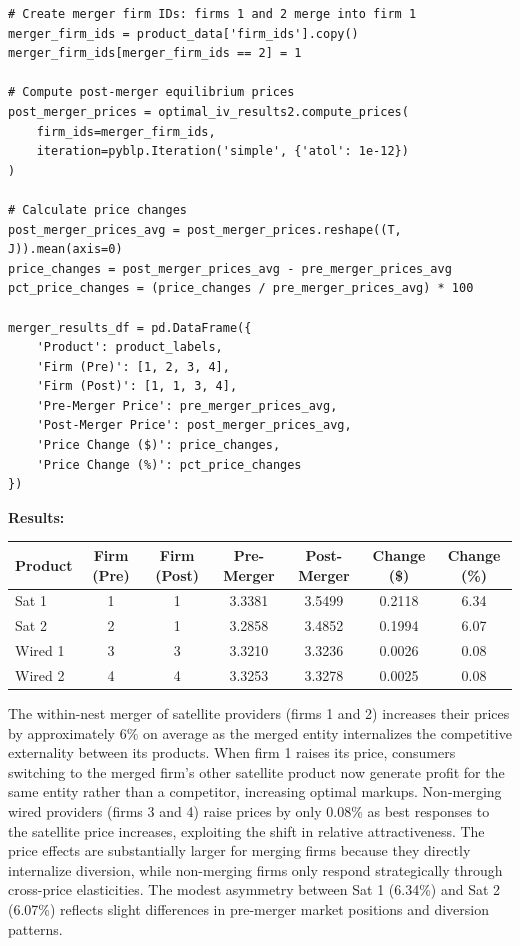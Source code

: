\documentclass[english,11pt]{article}
\begin{document}
\begin{enumerate}
\begin{verbatim}
# Create merger firm IDs: firms 1 and 2 merge into firm 1
merger_firm_ids = product_data['firm_ids'].copy()
merger_firm_ids[merger_firm_ids == 2] = 1

# Compute post-merger equilibrium prices
post_merger_prices = optimal_iv_results2.compute_prices(
    firm_ids=merger_firm_ids,
    iteration=pyblp.Iteration('simple', {'atol': 1e-12})
)

# Calculate price changes
post_merger_prices_avg = post_merger_prices.reshape((T, J)).mean(axis=0)
price_changes = post_merger_prices_avg - pre_merger_prices_avg
pct_price_changes = (price_changes / pre_merger_prices_avg) * 100

merger_results_df = pd.DataFrame({
    'Product': product_labels,
    'Firm (Pre)': [1, 2, 3, 4],
    'Firm (Post)': [1, 1, 3, 4],
    'Pre-Merger Price': pre_merger_prices_avg,
    'Post-Merger Price': post_merger_prices_avg,
    'Price Change ($)': price_changes,
    'Price Change (%)': pct_price_changes
})
\end{verbatim}

\textbf{Results:}

\begin{center}
\begin{tabular}{lcccccc}
\hline
Product & Firm (Pre) & Firm (Post) & Pre-Merger & Post-Merger & Change (\$) & Change (\%) \\
\hline
Sat 1 & 1 & 1 & 3.3381 & 3.5499 & 0.2118 & 6.34 \\
Sat 2 & 2 & 1 & 3.2858 & 3.4852 & 0.1994 & 6.07 \\
Wired 1 & 3 & 3 & 3.3210 & 3.3236 & 0.0026 & 0.08 \\
Wired 2 & 4 & 4 & 3.3253 & 3.3278 & 0.0025 & 0.08 \\
\hline
\end{tabular}
\end{center}

The within-nest merger of satellite providers (firms 1 and 2) increases their prices by approximately 6\% on average as the merged entity internalizes the competitive externality between its products. When firm 1 raises its price, consumers switching to the merged firm's other satellite product now generate profit for the same entity rather than a competitor, increasing optimal markups. Non-merging wired providers (firms 3 and 4) raise prices by only 0.08\% as best responses to the satellite price increases, exploiting the shift in relative attractiveness. The price effects are substantially larger for merging firms because they directly internalize diversion, while non-merging firms only respond strategically through cross-price elasticities. The modest asymmetry between Sat 1 (6.34\%) and Sat 2 (6.07\%) reflects slight differences in pre-merger market positions and diversion patterns.


\end{enumerate}
\end{document}
